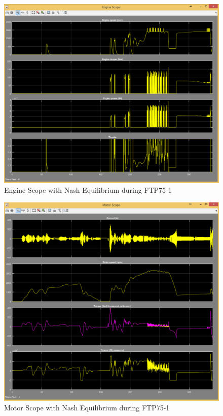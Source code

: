 \begin{figure}[h]
\centering
\includegraphics[scale=0.37]{figures/NashEquilibrium/FTP75-1/engine13Juni}
\caption{Engine Scope with Nash Equilibrium during FTP75-1}
\label{fig:ene1}
\end{figure}

\begin{figure}[h]
\centering
\includegraphics[scale=0.37]{figures/NashEquilibrium/FTP75-1/motor13Juni}
\caption{Motor Scope with Nash Equilibrium during FTP75-1}
\label{fig:me1}
\end{figure}

